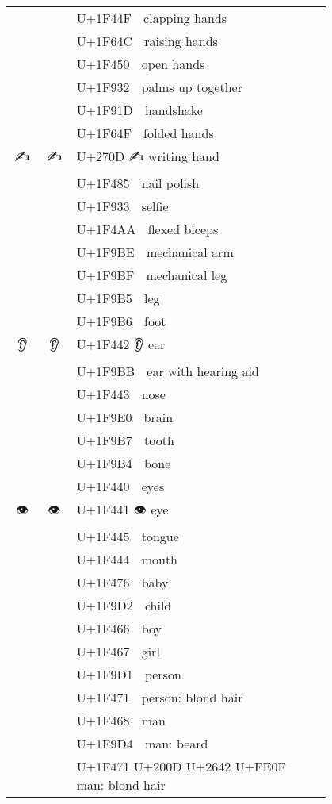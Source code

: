 \documentclass[a4paper,12pt]{article}
\newcommand{\fontA}[1]{{\fontspec[RawFeature={dist,ccmp}]{Segoe UI Emoji} #1}}
\newcommand{\fontB}[1]{{\fontspec[Ligatures=Common,RawFeature={+ccmp}]{Symbola_Hinted.ttf} #1}}
\begin{document}
\begin{longtable}[c]{ccp{0.8\linewidth}}
\fontA{👏}&\fontB{👏}&U+1F44F 👏 clapping hands\\
\fontA{🙌}&\fontB{🙌}&U+1F64C 🙌 raising hands\\
\fontA{👐}&\fontB{👐}&U+1F450 👐 open hands\\
\fontA{🤲}&\fontB{🤲}&U+1F932 🤲 palms up together\\
\fontA{🤝}&\fontB{🤝}&U+1F91D 🤝 handshake\\
\fontA{🙏}&\fontB{🙏}&U+1F64F 🙏 folded hands\\
\fontA{✍}&\fontB{✍}&U+270D ✍ writing hand\\
\fontA{💅}&\fontB{💅}&U+1F485 💅 nail polish\\
\fontA{🤳}&\fontB{🤳}&U+1F933 🤳 selfie\\
\fontA{💪}&\fontB{💪}&U+1F4AA 💪 flexed biceps\\
\fontA{🦾}&\fontB{🦾}&U+1F9BE 🦾 mechanical arm\\
\fontA{🦿}&\fontB{🦿}&U+1F9BF 🦿 mechanical leg\\
\fontA{🦵}&\fontB{🦵}&U+1F9B5 🦵 leg\\
\fontA{🦶}&\fontB{🦶}&U+1F9B6 🦶 foot\\
\fontA{👂}&\fontB{👂}&U+1F442 👂 ear\\
\fontA{🦻}&\fontB{🦻}&U+1F9BB 🦻 ear with hearing aid\\
\fontA{👃}&\fontB{👃}&U+1F443 👃 nose\\
\fontA{🧠}&\fontB{🧠}&U+1F9E0 🧠 brain\\
\fontA{🦷}&\fontB{🦷}&U+1F9B7 🦷 tooth\\
\fontA{🦴}&\fontB{🦴}&U+1F9B4 🦴 bone\\
\fontA{👀}&\fontB{👀}&U+1F440 👀 eyes\\
\fontA{👁}&\fontB{👁}&U+1F441 👁 eye\\
\fontA{👅}&\fontB{👅}&U+1F445 👅 tongue\\
\fontA{👄}&\fontB{👄}&U+1F444 👄 mouth\\
\fontA{👶}&\fontB{👶}&U+1F476 👶 baby\\
\fontA{🧒}&\fontB{🧒}&U+1F9D2 🧒 child\\
\fontA{👦}&\fontB{👦}&U+1F466 👦 boy\\
\fontA{👧}&\fontB{👧}&U+1F467 👧 girl\\
\fontA{🧑}&\fontB{🧑}&U+1F9D1 🧑 person\\
\fontA{👱}&\fontB{👱}&U+1F471 👱 person: blond hair\\
\fontA{👨}&\fontB{👨}&U+1F468 👨 man\\
\fontA{🧔}&\fontB{🧔}&U+1F9D4 🧔 man: beard\\
\fontA{👱‍♂️}&\fontB{👱‍♂️}&U+1F471 U+200D U+2642 U+FE0F 👱‍♂️ man: blond hair\\

\end{longtable}
\end{document}
